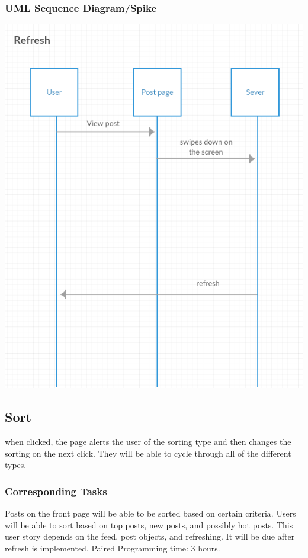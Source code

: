 \documentclass[12pt]{article}
\begin{document}
\subsubsection{UML Sequence Diagram/Spike}
\includegraphics[scale=0.5]{img/6.png}\linebreak

\subsection{Sort}
when clicked, the page alerts the user of the sorting type and then changes the
sorting on the next click. They will be able to cycle through all of the
different types.
\subsubsection{Corresponding Tasks}
	Posts on the front page will be able to be sorted based on certain criteria.  Users will be able to sort based on top posts, new posts, and possibly hot posts.  This user story depends on the feed, post objects, and refreshing.  It will be due after refresh is implemented.  Paired Programming time: 3 hours.
\end{document}
